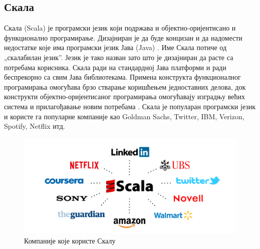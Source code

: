\documentclass[12pt, a4paper]{article}
\theoremstyle{definition}
\begin{document}
\subsection{Скала}
Скала (Scala) је програмски језик који подржава и објектно-оријентисано и функционално програмирање. Дизајниран је да буде концизан и да надомести недостатке које има програмски језик Јава (Java) \cite{wiki_scala}.
Име Скала потиче од „скалабилан језик”. Језик је тако назван зато што је дизајниран да расте са потребама корисника. Скала ради на стандардној Јава платформи и ради беспрекорно са свим Јава библиотекама. Примена конструкта функционалног програмирања омогућава брзо стварање коришћењем једноставних делова, док конструкти објектно-оријентисаног програмирања омогућавају изградњу већих система и прилагођавање новим потребама \cite{odersky2016}.
Скала је популаран програмски језик и користе га популарне компаније као Goldman Sachs, Twitter, IBM, Verizon, Spotify, Netflix итд.

\begin{figure}[H]
  \centering
      \includegraphics[scale=0.27]{slike/scalaCompanies}
  \caption{Компаније које користе Скалу}
  \label{fig:scalaCompanies}
\end{figure}
\end{document}
